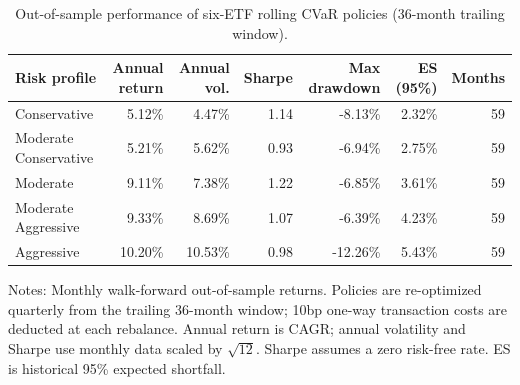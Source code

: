 \begin{table}[htbp]
\centering
\footnotesize
\caption{Out-of-sample performance of six-ETF rolling CVaR policies (36-month trailing window).}
\label{tab:gbi-rolling-policy-36m}
\begin{tabular}{lrrrrrr}
\toprule
Risk profile & Annual return & Annual vol. & Sharpe & Max drawdown & ES (95\%) & Months \\
\midrule
Conservative & 5.12\% & 4.47\% & 1.14 & -8.13\% & 2.32\% & 59 \\
Moderate Conservative & 5.21\% & 5.62\% & 0.93 & -6.94\% & 2.75\% & 59 \\
Moderate & 9.11\% & 7.38\% & 1.22 & -6.85\% & 3.61\% & 59 \\
Moderate Aggressive & 9.33\% & 8.69\% & 1.07 & -6.39\% & 4.23\% & 59 \\
Aggressive & 10.20\% & 10.53\% & 0.98 & -12.26\% & 5.43\% & 59 \\
\bottomrule
\end{tabular}
\vspace{2pt}
\begin{minipage}{0.96\linewidth}
\footnotesize
Notes: Monthly walk-forward out-of-sample returns. Policies are re-optimized quarterly from the trailing 36-month window; 10bp one-way transaction costs are deducted at each rebalance. Annual return is CAGR; annual volatility and Sharpe use monthly data scaled by $\sqrt{12}$. Sharpe assumes a zero risk-free rate. ES is historical 95\% expected shortfall.
\end{minipage}
\end{table}
